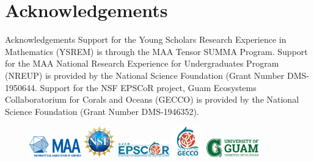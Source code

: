 \documentclass{beamer}
\begin{document}








\section{Acknowledgements}
\begin{frame}{Acknowledgements}
    Support for the Young Scholars Research Experience in Mathematics (YSREM)  is through the MAA Tensor SUMMA Program. Support for the MAA National Research Experience for Undergraduates Program (NREUP) is provided by the National Science Foundation (Grant Number DMS-1950644. Support for the NSF EPSCoR project, Guam Ecosystems Collaboratorium for Corals and Oceans (GECCO) is provided by the National Science Foundation (Grant Number DMS-1946352).
    \begin{figure}
        \includegraphics[width = 0.20\textwidth]{Figures/MAA_logo_PMS286.jpg}
        \label{MAA}
        \includegraphics[width = 0.12\textwidth]{Figures/NSF_4-Color_bitmap_Logo.png}
        \label{NSF}
        \includegraphics[width = 0.20\textwidth]{Figures/GECCO.png}
        \label{gecco}
        \includegraphics[width = 0.12\textwidth]{Figures/epscor.jpeg}
        \label{epscor}
        \includegraphics[width = 0.20\textwidth]{Figures/UOG-horizontal.png}
        \label{uog}
    \end{figure}
\end{frame}
\end{document}

